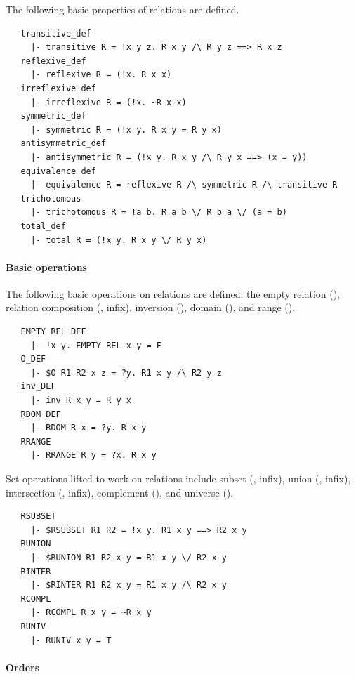 {The following basic properties of relations are defined.
%
\begin{hol}
\begin{verbatim}
   transitive_def
     |- transitive R = !x y z. R x y /\ R y z ==> R x z
   reflexive_def
     |- reflexive R = (!x. R x x)
   irreflexive_def
     |- irreflexive R = (!x. ~R x x)
   symmetric_def
     |- symmetric R = (!x y. R x y = R y x)
   antisymmetric_def
     |- antisymmetric R = (!x y. R x y /\ R y x ==> (x = y))
   equivalence_def
     |- equivalence R = reflexive R /\ symmetric R /\ transitive R
   trichotomous
     |- trichotomous R = !a b. R a b \/ R b a \/ (a = b)
   total_def
     |- total R = (!x y. R x y \/ R y x)
\end{verbatim}
\end{hol}

\paragraph{Basic operations}

The following basic operations on relations are defined: the empty
relation (), relation composition (,
infix), inversion (), domain (), and range
().
%
\begin{hol}
\begin{verbatim}
   EMPTY_REL_DEF
     |- !x y. EMPTY_REL x y = F
   O_DEF
     |- $O R1 R2 x z = ?y. R1 x y /\ R2 y z
   inv_DEF
     |- inv R x y = R y x
   RDOM_DEF
     |- RDOM R x = ?y. R x y
   RRANGE
     |- RRANGE R y = ?x. R x y
\end{verbatim}
\end{hol}

\noindent Set operations lifted to work on relations include subset
(, infix), union (, infix),
intersection (, infix), complement (),
and universe ().
%
\begin{hol}
\begin{verbatim}
   RSUBSET
     |- $RSUBSET R1 R2 = !x y. R1 x y ==> R2 x y
   RUNION
     |- $RUNION R1 R2 x y = R1 x y \/ R2 x y
   RINTER
     |- $RINTER R1 R2 x y = R1 x y /\ R2 x y
   RCOMPL
     |- RCOMPL R x y = ~R x y
   RUNIV
     |- RUNIV x y = T
\end{verbatim}
\end{hol}

\paragraph {Orders}

}
